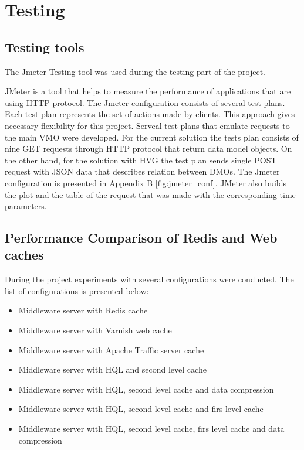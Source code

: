 \section{Testing}

\subsection{Testing tools}

The Jmeter Testing tool was used during the testing part of the project. 

JMeter is a tool that helps to measure the performance of applications that are using HTTP protocol. The Jmeter configuration consists of several test plans. Each test plan represents the set of actions made by clients. This approach gives necessary flexibility for this project. Serveal test plans that emulate requests to the main VMO were developed. For the current solution the tests plan consists of nine GET requests through HTTP protocol that return data model objects. On the other hand, for the solution with HVG the test plan sends single POST request with JSON data that describes relation between DMOs. The Jmeter configuration is presented in Appendix B \ref{fig:jmeter_conf}. JMeter also builds the plot and the table of the request that was made with the corresponding time parameters.

\subsection{Performance Comparison of Redis and Web caches}


During the project experiments with several configurations were conducted. The list of configurations is presented below:

\begin{itemize}
  \item Middleware server with Redis cache
  \item Middleware server with Varnish web cache
  \item Middleware server with Apache Traffic server cache
  \item Middleware server with HQL and second level cache
  \item Middleware server with HQL, second level cache and data compression
  \item Middleware server with HQL, second level cache and firs level cache
  \item Middleware server with HQL, second level cache, firs level cache and data compression
\end{itemize}

